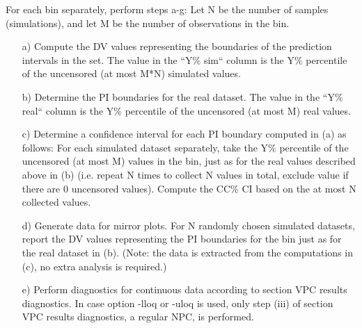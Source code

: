 For each bin separately, perform steps a-g: 
Let N be the number of samples (simulations), and let M be the number of observations in the bin.
\begin{itemize}
	\item[a)] Compute the DV values representing the boundaries of the prediction intervals in the set. The value in the “Y\% sim“ column is the Y\% percentile of the uncensored (at most M*N) simulated values.

	\item[b)] Determine the PI boundaries for the real dataset. The value in the “Y\% real“ column is the Y\% percentile of the uncensored (at most M) real values.

	\item[c)] Determine a confidence interval for each PI boundary computed in (a) as follows: 
For each simulated dataset separately, take the Y\% percentile of the uncensored (at most M) values in the bin, just as for the real values described above in (b) (i.e. repeat N times to collect N values in total, exclude value if there are 0 uncensored values). Compute the CC\% CI based on the at most N collected values.

	\item[d)] Generate data for mirror plots. For N randomly chosen simulated datasets, report the DV values representing the PI boundaries for the bin just as for the real dataset in (b). (Note: the data is extracted from the computations in (c), no extra analysis is required.)

	\item[e)] Perform diagnostics for continuous data according to section VPC results diagnostics. In case option -lloq or -uloq is used, only step (iii) of section VPC results diagnostics, a regular NPC, is performed.  


\end{itemize}
